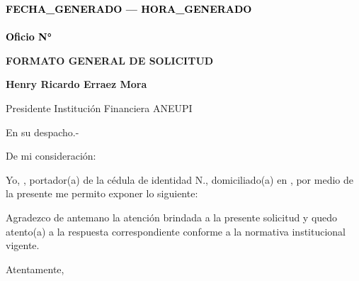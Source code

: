 \documentclass[a4paper,12pt]{article}
\begin{document}
\pagestyle{empty}

\vspace*{-5.5cm}
\begin{flushright}
{\footnotesize \textcolor{black}{\textbf{{{FECHA_GENERADO}} --- {{{HORA_GENERADO}}}}}} \\[-10pt] %
{\footnotesize \textcolor{black}{\underline{\hspace{7.5cm}}}} \\[-2pt] %
{\footnotesize \textcolor{black}{\textbf{Oficio N° }}} 
\end{flushright}


\vspace{2.5cm}
\noindent
\hspace*{\dimexpr\textwidth+1cm\relax}


\begin{center}
        \textbf{\large FORMATO GENERAL DE SOLICITUD}
\end{center}

\vspace{0.8cm}

\noindent \textbf{Henry Ricardo Erraez Mora} 

\noindent Presidente Institución Financiera ANEUPI 

\noindent En su despacho.-

\vspace{1cm}

\noindent De mi consideración:

\noindent 
Yo, \textbf{\underline{\hspace{6cm}}}, portador(a) de la cédula de identidad N.\textbf{\underline{\hspace{4cm}}}, domiciliado(a) en \textbf{\underline{\hspace{8cm}}}, por medio de la presente me permito exponer lo siguiente:

\vspace{0.8cm}


\noindent
\textbf{\underline{\hspace{17cm}}}

\vspace{1cm}

\textbf{\underline{\hspace{17cm}}}

\vspace{1cm}

\noindent Agradezco de antemano la atención brindada a la presente solicitud y quedo atento(a) a la respuesta correspondiente conforme a la normativa institucional vigente.

\noindent Atentamente,

\vspace{2.5cm}

\noindent{}  

\noindent{}      

\noindent{}   

\noindent{} 
\end{document}
